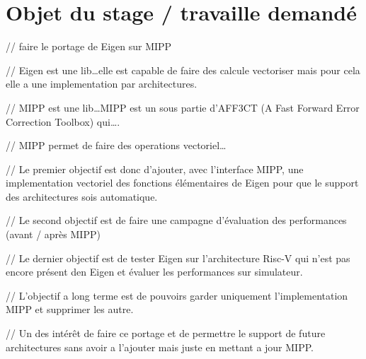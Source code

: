 \section{Objet du stage / travaille demandé}

// faire le portage de Eigen sur MIPP

// Eigen est une lib\dots elle est capable de faire des calcule vectoriser mais pour
cela elle a une implementation par architectures.

// MIPP est une lib\dots MIPP est un sous partie d'AFF3CT (A Fast Forward Error Correction
Toolbox) qui\dots.

// MIPP permet de faire des operations vectoriel\dots

// Le premier objectif est donc d'ajouter, avec l'interface MIPP, une implementation
vectoriel des fonctions élémentaires de Eigen pour que le support des architectures sois
automatique.

// Le second objectif est de faire une campagne d'évaluation des performances (avant /
après MIPP)

// Le dernier objectif est de tester Eigen sur l'architecture Risc-V qui n'est pas encore
présent den Eigen et évaluer les performances sur simulateur.

// L'objectif a long terme est de pouvoirs garder uniquement l'implementation MIPP et
supprimer les autre.

// Un des intérêt de faire ce portage et de permettre le support de future architectures
sans avoir a l'ajouter mais juste en mettant a jour MIPP.

